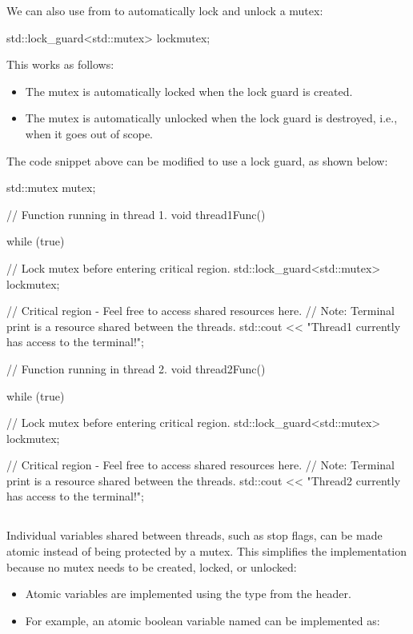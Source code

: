 \noindent We can also use  from  to automatically lock and
unlock a mutex:

\begin{cppcode}
std::lock_guard<std::mutex> lock{mutex};
\end{cppcode}

\noindent This works as follows:
\begin{itemize}
  \item The mutex is automatically locked when the lock guard is created.
  \item The mutex is automatically unlocked when the lock guard is destroyed, i.e., when it goes
    out of scope.
\end{itemize}
The code snippet above can be modified to use a lock guard, as shown below:

\begin{cppcode}
std::mutex mutex{};

// Function running in thread 1.
void thread1Func()
{
    while (true)
    {
        {
            // Lock mutex before entering critical region.
            std::lock_guard<std::mutex> lock{mutex};

            // Critical region - Feel free to access shared resources here.
            // Note: Terminal print is a resource shared between the threads.
            std::cout << "Thread1 currently has access to the terminal!\n";
        }
    }
}

// Function running in thread 2.
void thread2Func()
{
    while (true)
    {
        {
            // Lock mutex before entering critical region.
            std::lock_guard<std::mutex> lock{mutex};

            // Critical region - Feel free to access shared resources here.
            // Note: Terminal print is a resource shared between the threads.
            std::cout << "Thread2 currently has access to the terminal!\n";
        }
    }
}
\end{cppcode}

\subsection{}
\label{c6:sec:atomic}
Individual variables shared between threads, such as stop flags, can be made atomic instead of
being protected by a mutex. This simplifies the implementation because no mutex needs to be
created, locked, or unlocked:
\begin{itemize}
  \item Atomic variables are implemented using the  type from the 
    header.
  \item For example, an atomic boolean variable named  can be implemented as:
\end{itemize}

